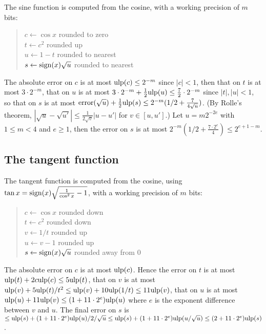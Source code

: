 \documentclass[12pt]{amsart}
\def\ulp{{\rm ulp}}
\begin{document}
The sine function is computed from the cosine, with a working precision of
$m$ bits:
\begin{quote}
$c \leftarrow \cos x$ rounded to zero \\
$t \leftarrow c^2$ rounded up \\
$u \leftarrow 1 - t$ rounded to nearest \\
$s \leftarrow {\rm sign}(x) \sqrt{u}$ rounded to nearest \\
\end{quote}
The absolute error on $c$ is at most $\ulp(c)
\le 2^{-m}$ since $|c| < 1$,
then that on
$t$ is at most $3 \cdot 2^{-m}$, that on $u$ is at most $3 \cdot 2^{-m} + 
\frac{1}{2}\ulp(u) \le \frac{7}{2} \cdot 2^{-m}$
since $|t|, |u| < 1$, so that on $s$ is at most ${\rm error}(\sqrt{u})
 + \frac{1}{2} \ulp(s) \le 2^{-m} (1/2 + \frac{7}{4 \sqrt{u}})$.
(By Rolle's theorem,
$|\sqrt{u} - \sqrt{u'}| \le \frac{1}{2 \sqrt{v}} |u-u'|$ for
$v \in [u, u']$.)
Let $u = m 2^{-2e}$ with $1 \le m < 4$ and $e \ge 1$, then 
the error on $s$ is at most $2^{-m} (1/2 + \frac{7 \cdot 2^{e}}{4})
        \le 2^{e + 1 - m}$.

\subsection{The tangent function}

The tangent function is computed from the cosine, 
using $\tan x = {\rm sign}(x) \sqrt{\frac{1}{\cos^2 x} - 1}$,
with a working precision of $m$ bits:
\begin{quote}
$c \leftarrow \cos x$ rounded down \\ %
$t \leftarrow c^2$ rounded down \\    %
$v \leftarrow 1/t$ rounded up \\      %
$u \leftarrow v - 1$ rounded up \\    %
$s \leftarrow {\rm sign}(x) \sqrt{u}$ rounded away from $0$ \\
\end{quote}
The absolute error on $c$ is at most $\ulp(c)$.
Hence the error on
$t$ is at most $\ulp(t) + 2 c \ulp(c) \le 5 \ulp(t)$,
that on $v$ is at most $\ulp(v) + 5 \ulp(t)/t^2
        \le \ulp(v) + 10 \ulp(1/t) \le 11 \ulp(v)$,
that on $u$ is at most $\ulp(u) + 11 \ulp(v) \le (1 + 11 \cdot 2^e) \ulp(u)$
where $e$ is the exponent difference between $v$ and $u$.
The final error on $s$ is $\le \ulp(s) + (1+11 \cdot 2^e) \ulp(u)/2/\sqrt{u}
        \le \ulp(s) + (1+11 \cdot 2^e) \ulp(u/\sqrt{u})
        \le (2 + 11 \cdot 2^e) \ulp(s)$.
\end{document}
